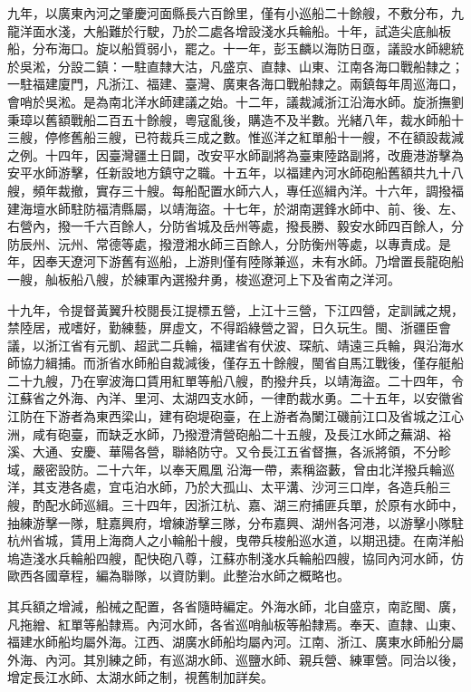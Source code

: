 \begin{pinyinscope}
九年，以廣東內河之肇慶河面縣長六百餘里，僅有小巡船二十餘艘，不敷分布，九龍洋面水淺，大船難於行駛，乃於二處各增設淺水兵輪船。十年，試造尖底舢板船，分布海口。旋以船質弱小，罷之。十一年，彭玉麟以海防日亟，議設水師總統於吳淞，分設二鎮：一駐直隸大沽，凡盛京、直隸、山東、江南各海口戰船隸之；一駐福建廈門，凡浙江、福建、臺灣、廣東各海口戰船隸之。兩鎮每年周巡海口，會哨於吳淞。是為南北洋水師建議之始。十二年，議裁減浙江沿海水師。旋浙撫劉秉璋以舊額戰船二百五十餘艘，粵寇亂後，購造不及半數。光緒八年，裁水師船十三艘，停修舊船三艘，已符裁兵三成之數。惟巡洋之紅單船十一艘，不在額設裁減之例。十四年，因臺灣疆土日闢，改安平水師副將為臺東陸路副將，改鹿港游擊為安平水師游擊，任新設地方鎮守之職。十五年，以福建內河水師砲船舊額共九十八艘，頻年裁撤，實存三十艘。每船配置水師六人，專任巡緝內洋。十六年，調撥福建海壇水師駐防福清縣屬，以靖海盜。十七年，於湖南選鋒水師中、前、後、左、右營內，撥一千六百餘人，分防省城及岳州等處，撥長勝、毅安水師四百餘人，分防辰州、沅州、常德等處，撥澄湘水師三百餘人，分防衡州等處，以專責成。是年，因奉天遼河下游舊有巡船，上游則僅有陸隊兼巡，未有水師。乃增置長龍砲船一艘，舢板船八艘，於練軍內選撥弁勇，梭巡遼河上下及省南之洋河。

十九年，令提督黃翼升校閱長江提標五營，上江十三營，下江四營，定訓誡之規，禁陸居，戒嗜好，勤練藝，屏虛文，不得蹈綠營之習，日久玩生。閩、浙疆臣會議，以浙江省有元凱、超武二兵輪，福建省有伏波、琛航、靖遠三兵輪，與沿海水師協力緝捕。而浙省水師船自裁減後，僅存五十餘艘，閩省自馬江戰後，僅存艇船二十九艘，乃在寧波海口賃用紅單等船八艘，酌撥弁兵，以靖海盜。二十四年，令江蘇省之外海、內洋、里河、太湖四支水師，一律酌裁水勇。二十五年，以安徽省江防在下游者為東西梁山，建有砲堤砲臺，在上游者為闌江磯前江口及省城之江心洲，咸有砲臺，而缺乏水師，乃撥澄清營砲船二十五艘，及長江水師之蕪湖、裕溪、大通、安慶、華陽各營，聯絡防守。又令長江五省督撫，各派將領，不分畛域，嚴密設防。二十六年，以奉天鳳凰沿海一帶，素稱盜藪，曾由北洋撥兵輪巡洋，其支港各處，宜屯泊水師，乃於大孤山、太平溝、沙河三口岸，各造兵船三艘，酌配水師巡緝。三十四年，因浙江杭、嘉、湖三府捕匪兵單，於原有水師中，抽練游擊一隊，駐嘉興府，增練游擊三隊，分布嘉興、湖州各河港，以游擊小隊駐杭州省城，賃用上海商人之小輪船十艘，曳帶兵梭船巡水道，以期迅捷。在南洋船塢造淺水兵輪船四艘，配快砲八尊，江蘇亦制淺水兵輪船四艘，協同內河水師，仿歐西各國章程，編為聯隊，以資防剿。此整治水師之概略也。

其兵額之增減，船械之配置，各省隨時編定。外海水師，北自盛京，南訖閩、廣，凡拖繒、紅單等船隸焉。內河水師，各省巡哨舢板等船隸焉。奉天、直隸、山東、福建水師船均屬外海。江西、湖廣水師船均屬內河。江南、浙江、廣東水師船分屬外海、內河。其別練之師，有巡湖水師、巡鹽水師、親兵營、練軍營。同治以後，增定長江水師、太湖水師之制，視舊制加詳矣。


\end{pinyinscope}
